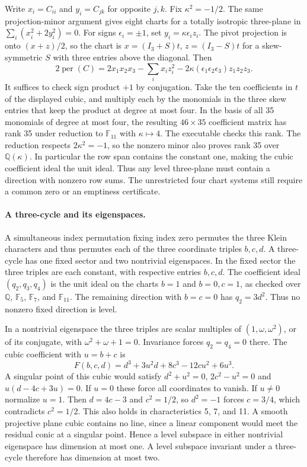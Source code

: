 Write \(x_i=C_{ii}\) and \(y_i=C_{jk}\) for opposite \(j,k\). Fix
\(\kappa^2=-1/2\). The same projection-minor argument gives eight charts
for a totally isotropic three-plane in \(\sum_i(x_i^2+2y_i^2)=0\).
For signs \(\epsilon_i=\pm1\), set \(y_i=\kappa\epsilon_i z_i\).
The pivot projection is onto \((x+z)/2\), so the chart is
\(x=(I_3+S)t\), \(z=(I_3-S)t\) for a skew-symmetric \(S\) with three
entries above the diagonal. Then
\begin{equation*}
 2\operatorname{per}(C)=2x_1x_2x_3-\sum_i x_i z_i^2
             -2\kappa(\epsilon_1\epsilon_2\epsilon_3)z_1z_2z_3.
\end{equation*}
It suffices to check sign product \(+1\) by conjugation. Take the ten
coefficients in \(t\) of the displayed cubic, and multiply each by
the monomials in the three skew entries that keep the product at
degree at most four. In the basis of all 35 monomials of degree at most
four, the resulting \(46\times35\) coefficient matrix has rank 35
under reduction to \(\mathbb F_{11}\) with \(\kappa\mapsto4\). The
executable checks this rank. The reduction respects \(2\kappa^2=-1\),
so the nonzero minor also proves rank 35 over \(\mathbb Q(\kappa)\).
In particular the row span contains the constant one, making the cubic
coefficient ideal the unit ideal. Thus any level three-plane must
contain a direction with nonzero row sums. The unrestricted four chart
systems still require a common zero or an emptiness certificate.

\paragraph{A three-cycle and its eigenspaces.}
A simultaneous index permutation fixing index zero permutes the three
Klein characters and thus permutes each of the three coordinate
triples \(b,c,d\). A three-cycle has one fixed sector and two nontrivial
eigenspaces. In the fixed sector the three triples are each constant,
with respective entries \(b,c,d\). The coefficient ideal
\((q_2,q_3,q_4)\) is the unit ideal on the charts \(b=1\) and
\(b=0,c=1\), as checked over \(\mathbb Q\), \(\mathbb F_5\),
\(\mathbb F_7\), and \(\mathbb F_{11}\). The remaining direction with \(b=c=0\)
has \(q_2=3d^2\). Thus no nonzero fixed direction is level.

In a nontrivial eigenspace the three triples are scalar multiples of
\((1,\omega,\omega^2)\), or of its conjugate, with
\(\omega^2+\omega+1=0\). Invariance forces \(q_2=q_4=0\) there.
The cubic coefficient with \(u=b+c\) is
\begin{equation*}
 F(b,c,d)=d^3+3u^2d+8c^3-12cu^2+6u^3.
\end{equation*}
A singular point of this cubic would satisfy
\(d^2+u^2=0\), \(2c^2-u^2=0\) and \(u(d-4c+3u)=0\).
If \(u=0\) these force all coordinates to vanish. If \(u\ne0\)
normalize \(u=1\). Then \(d=4c-3\) and \(c^2=1/2\), so
\(d^2=-1\) forces \(c=3/4\), which contradicts \(c^2=1/2\).
This also holds in characteristics 5, 7, and 11. A smooth projective
plane cubic contains no line, since a linear component would meet
the residual conic at a singular point. Hence a level subspace in
either nontrivial eigenspace has dimension at most one.
A level subspace invariant under a three-cycle therefore has
dimension at most two.

